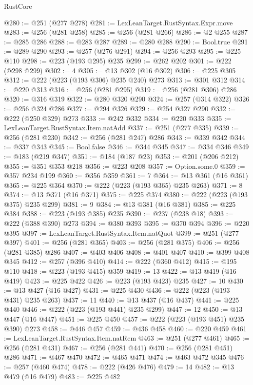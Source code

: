 \begin{lexlean}{RustCore}
\begin{coremodule}
@280 := @251 (@277 @278)
@281 := LexLeanTarget.RustSyntax.Expr.move
@283 := @256 (@281 @258)
@285 := @256 (@281 @266)
@286 := @2 @255
@287 := @285 @286
@288 := @283 @287
@289 := @280 @288
@290 := Bool.true
@291 := @289 @290
@293 := @257 (@276 @291)
@294 := @256 @293
@295 := @225 @110
@298 := @223 (@193 @295) @235
@299 := @262 @202
@301 := @222 (@298 @299)
@302 := 4
@305 := @13 @302 (@16 @302)
@306 := @225 @305
@312 := @222 (@223 (@193 @306) @235 @240) @273
@313 := @301 @312
@314 := @220 @313
@316 := @256 (@281 @295)
@319 := @256 (@281 @306) @286
@320 := @316 @319
@322 := @280 @320 @290
@324 := @257 (@314 @322)
@326 := @256 @324 @286
@327 := @294 @326
@329 := @254 @327 @290
@332 := @222 (@250 @329) @273
@333 := @242 @332
@334 := @220 @333
@335 := LexLeanTarget.RustSyntax.Item.natAdd
@337 := @251 (@277 @335)
@339 := @256 (@281 @230)
@342 := @256 (@281 @247) @286
@343 := @339 @342
@344 := @337 @343
@345 := Bool.false
@346 := @344 @345
@347 := @334 @346
@349 := @183 (@219 @347)
@351 := @184 (@187 @23)
@353 := @201 (@206 @212)
@355 := @351 @353 @218
@356 := @223 @208
@357 := Option.some.{0}
@359 := @357 @234 @199
@360 := @356 @359
@361 := 7
@364 := @13 @361 (@16 @361)
@365 := @225 @364
@370 := @222 (@223 (@193 @365) @235 @263)
@371 := 8
@374 := @13 @371 (@16 @371)
@375 := @225 @374
@380 := @222 (@223 (@193 @375) @235 @299)
@381 := 9
@384 := @13 @381 (@16 @381)
@385 := @225 @384
@388 := @223 (@193 @385) @235
@390 := @237 (@238 @18)
@393 := @222 (@388 @390) @273
@394 := @380 @393
@395 := @370 @394
@396 := @220 @395
@397 := LexLeanTarget.RustSyntax.Item.natQuot
@399 := @251 (@277 @397)
@401 := @256 (@281 @365)
@403 := @256 (@281 @375)
@406 := @256 (@281 @385) @286
@407 := @403 @406
@408 := @401 @407
@410 := @399 @408 @345
@412 := @257 (@396 @410)
@414 := @222 (@360 @412)
@415 := @195 @110
@418 := @223 (@193 @415) @359
@419 := 13
@422 := @13 @419 (@16 @419)
@423 := @225 @422
@426 := @223 (@193 @423) @235
@427 := 10
@430 := @13 @427 (@16 @427)
@431 := @225 @430
@436 := @222 (@223 (@193 @431) @235 @263)
@437 := 11
@440 := @13 @437 (@16 @437)
@441 := @225 @440
@446 := @222 (@223 (@193 @441) @235 @299)
@447 := 12
@450 := @13 @447 (@16 @447)
@451 := @225 @450
@457 := @222 (@223 (@193 @451) @235 @390) @273
@458 := @446 @457
@459 := @436 @458
@460 := @220 @459
@461 := LexLeanTarget.RustSyntax.Item.natRem
@463 := @251 (@277 @461)
@465 := @256 (@281 @431)
@467 := @256 (@281 @441)
@470 := @256 (@281 @451) @286
@471 := @467 @470
@472 := @465 @471
@474 := @463 @472 @345
@476 := @257 (@460 @474)
@478 := @222 (@426 @476)
@479 := 14
@482 := @13 @479 (@16 @479)
@483 := @225 @482

\end{coremodule}
\end{lexlean}
